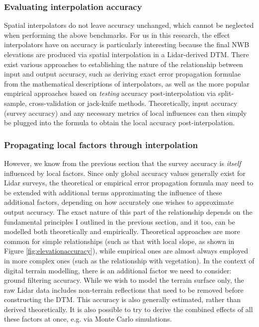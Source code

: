 \subsubsection{Evaluating interpolation accuracy}

Spatial interpolators do not leave accuracy unchanged, which cannot be neglected when performing the above benchmarks. For us in this research, the effect interpolators have on accuracy is particularly interesting because the final NWB elevations are produced via spatial interpolation in a Lidar-derived DTM. There exist various approaches to establishing the nature of the relationship between input and output accuracy, such as deriving exact error propagation formulae from the mathematical descriptions of interpolators, as well as the more popular empirical approaches based on \textit{testing} accuracy post-interpolation via split-sample, cross-validation or jack-knife methods. Theoretically, input accuracy (survey accuracy) and any necessary metrics of local influences can then simply be plugged into the formula to obtain the local accuracy post-interpolation.

\subsubsection{Propagating local factors through interpolation}

However, we know from the previous section that the survey accuracy is \textit{itself} influenced by local factors. Since only global accuracy values generally exist for Lidar surveys, the theoretical or empirical error propagation formula may need to be extended with additional terms approximating the influence of these additional factors, depending on how accurately one wishes to approximate output accuracy. The exact nature of this part of the relationship depends on the fundamental principles I outlined in the previous section, and it too, can be modelled both theoretically and empirically. Theoretical approaches are more common for simple relationships (such as that with local slope, as shown in Figure \ref{fig:elevationaccuracy}), while empirical ones are almost always employed in more complex ones (such as the relationship with vegetation). In the context of digital terrain modelling, there is an additional factor we need to consider: ground filtering accuracy. While we wish to model the terrain surface only, the raw Lidar data includes non-terrain reflections that need to be removed before constructing the DTM. This accuracy is also generally estimated, rather than derived theoretically. It is also possible to try to derive the combined effects of all these factors at once, e.g. via Monte Carlo simulations.


